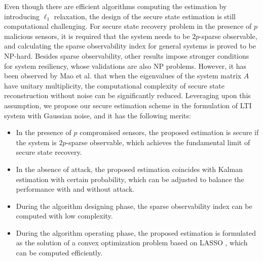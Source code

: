 \documentclass{ieeetrans}   %
\begin{document}
Even though there are efficient algorithms computing the estimation by introducing $\ell_1$ relaxation, the design of the secure state estimation is still computational challenging. For secure state recovery problem in the presence of $p$ malicious sensors, it is required that the system needs to be $2p$-sparse observable\cite{ShoukryTAC2016}, and calculating the sparse observability index for general systems is proved to be NP-hard\cite{yanwen_CDC19}. Besides sparse observability, other results \cite{FawziTAC2014}\cite{liuxinghua-TAC2020}\cite{sandberg_TAC2014} impose stronger conditions for system resiliency, whose validations are also NP problems.
However, it has been observed by Mao et al. \cite{yanwen_CDC19} that when the eigenvalues of the system matrix $A$ have unitary multiplicity, the computational complexity of secure state reconstruction without noise can be significantly reduced.
Leveraging upon this assumption, we propose our secure estimation scheme in the formulation of LTI system with Gaussian noise, and it has the following merits:
\begin{itemize}[left=0pt]
	\item In the presence of $p$ compromised sensors, the proposed estimation is secure if the system is $2p$-sparse observable, which achieves the fundamental limit of secure state recovery\cite{ShoukryTAC2016}.
	\item In the absence of attack, the proposed estimation coincides with Kalman estimation with certain probability, which can be adjusted to balance the performance with and without attack.
	\item During the algorithm designing phase, the sparse observability index can be computed with low complexity.
	\item During the algorithm operating phase, the proposed estimation is formulated as the solution of a convex optimization problem based on LASSO \cite{LASSOTibshirani}, which can be computed efficiently.
\end{itemize}


\end{document}

